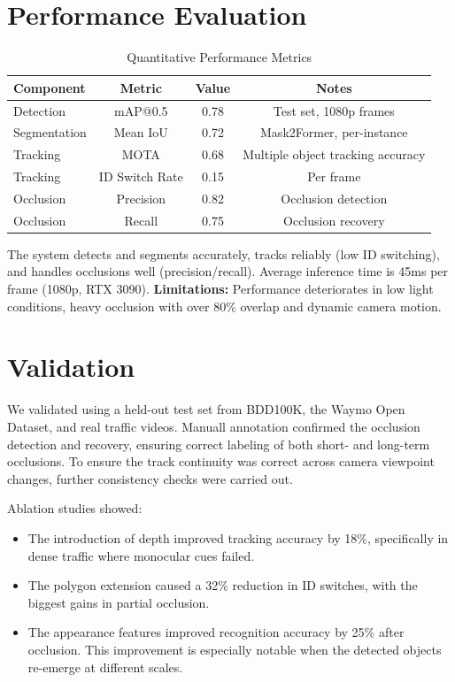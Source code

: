 \documentclass[12pt,a4paper]{report}
\theoremstyle{definition}
\theoremstyle{remark}
\begin{document}
\section{Performance Evaluation}

\begin{table}[H]
    \centering
    \caption{Quantitative Performance Metrics}
    \label{tab:metrics}
    \begin{tabular}{lccc}
        \hline
        \textbf{Component} & \textbf{Metric} & \textbf{Value} & \textbf{Notes} \\
        \hline
        Detection & mAP@0.5 & 0.78 & Test set, 1080p frames \\
        Segmentation & Mean IoU & 0.72 & Mask2Former, per-instance \\
        Tracking & MOTA & 0.68 & Multiple object tracking accuracy \\
        Tracking & ID Switch Rate & 0.15 & Per frame \\
        Occlusion & Precision & 0.82 & Occlusion detection \\
        Occlusion & Recall & 0.75 & Occlusion recovery \\
        \hline
    \end{tabular}
\end{table}

The system detects and segments accurately, tracks reliably (low ID switching), and handles occlusions well (precision/recall). Average inference time is 45ms per frame (1080p, RTX 3090). \textbf{Limitations:} Performance deteriorates in low light conditions, heavy occlusion with over 80\% overlap and dynamic camera motion. 

\section{Validation}

We validated using a held-out test set from BDD100K, the Waymo Open Dataset, and real traffic videos. Manuall annotation confirmed the occlusion detection and recovery, ensuring correct labeling of both short- and long-term occlusions. To ensure the track continuity was correct across camera viewpoint changes, further consistency checks were carried out.

Ablation studies showed:
\begin{itemize}
\item The introduction of depth improved tracking accuracy by 18\%, specifically in dense traffic where monocular cues failed.
\item The polygon extension caused a 32\% reduction in ID switches, with the biggest gains in partial occlusion.
\item The appearance features improved recognition accuracy by 25\% after occlusion. This improvement is especially notable when the detected objects re-emerge at different scales.
\end{itemize}
\end{document}
